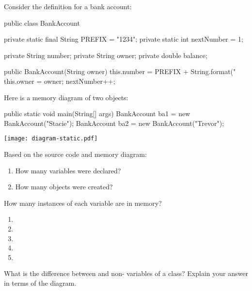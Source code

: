 
Consider the definition for a bank account:

\medskip
\begin{javalst}
public class BankAccount {
    private static final String PREFIX = "1234";
    private static int nextNumber = 1;

    private String number;
    private String owner;
    private double balance;

    public BankAccount(String owner) {
        this.number = PREFIX + String.format("%
        this.owner = owner;
        nextNumber++;
    }
}
\end{javalst}

\bigskip
Here is a memory diagram of two  objects:

\begin{javalst}
public static void main(String[] args) {
    BankAccount ba1 = new BankAccount("Stacie");
    BankAccount ba2 = new BankAccount("Trevor");
}
\end{javalst}

\hfill \texttt{[image: diagram-static.pdf]}
\hspace{2em} \null




\Q Based on the source code and memory diagram:

\begin{enumerate}
\item How many  variables were declared? 
\item How many  objects were created? 
\end{enumerate}


\Q How many instances of each variable are in memory?

\begin{multicols}{2}
\begin{enumerate}
\item {} 
\item {} 
\item {} 
\item {} 
\item {} 
\end{enumerate}
\end{multicols}


\Q \label{key3}
What is the difference between  and non- variables of a class?
Explain your answer in terms of the diagram.

